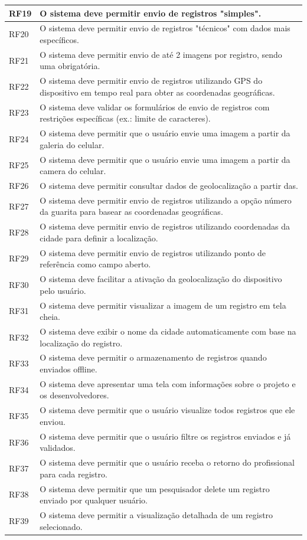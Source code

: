 \begin{longtable}{@{}p{1.5cm}p{13cm}@{}}
    RF19 & O sistema deve permitir envio de registros "simples". \\ \hline
    RF20 & O sistema deve permitir envio de registros "técnicos" com dados mais específicos. \\ \hline
    RF21 & O sistema deve permitir envio de até 2 imagens por registro, sendo uma obrigatória. \\ \hline
    RF22 & O sistema deve permitir envio de registros utilizando GPS do dispositivo em tempo real para obter as coordenadas geográficas. \\ \hline
    RF23 & O sistema deve validar os formulários de envio de registros com restrições específicas (ex.: limite de caracteres). \\ \hline
    RF24 & O sistema deve permitir que o usuário envie uma imagem a partir da galeria do celular. \\ \hline
    RF25 & O sistema deve permitir que o usuário envie uma imagem a partir da camera do celular. \\ \hline
    RF26 & O sistema deve permitir consultar dados de geolocalização a partir das. \\ \hline
    RF27 & O sistema deve permitir envio de registros utilizando a opção número da guarita para basear as coordenadas geográficas. \\ \hline
    RF28 & O sistema deve permitir envio de registros utilizando coordenadas da cidade para definir a localização. \\ \hline
    RF29 & O sistema deve permitir envio de registros utilizando ponto de referência como campo aberto. \\ \hline
    RF30 & O sistema deve facilitar a ativação da geolocalização do dispositivo pelo usuário. \\ \hline
    RF31 & O sistema deve permitir visualizar a imagem de um registro em tela cheia. \\ \hline
    RF32 & O sistema deve exibir o nome da cidade automaticamente com base na localização do registro. \\ \hline
    RF33 & O sistema deve permitir o armazenamento de registros quando enviados offline. \\ \hline

    RF34 & O sistema deve apresentar uma tela com informações sobre o projeto e os desenvolvedores. \\ \hline

    RF35 & O sistema deve permitir que o usuário visualize todos registros que ele enviou. \\ \hline
    RF36 & O sistema deve permitir que o usuário filtre os registros enviados e já validados. \\ \hline
    RF37 & O sistema deve permitir que o usuário receba o retorno do profissional para cada registro. \\ \hline
    RF38 & O sistema deve permitir que um pesquisador delete um registro enviado por qualquer usuário. \\ \hline
    RF39 & O sistema deve permitir a visualização detalhada de um registro selecionado. \\ \hline
    

\end{longtable}
